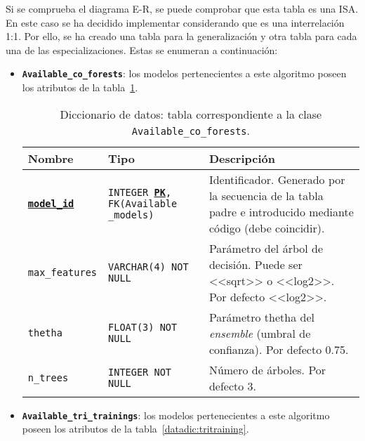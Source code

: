 Si se comprueba el diagrama E-R, se puede comprobar que esta tabla es una ISA. En este caso se ha decidido implementar considerando que es una interrelación 1:1. Por ello, se ha creado una tabla para la generalización y otra tabla para cada una de las especializaciones. Estas se enumeran a continuación:

\begin{itemize}
	\item \textbf{\texttt{Available\_co\_forests}}: los modelos pertenecientes a este algoritmo poseen los atributos de la tabla~\ref{datadic:coforest}.
	
	\begin{table}
		\small
		\begin{centering}
			\begin{tabular}{@{}p{6em} p{9em} p{19em}@{}}
				\toprule
				\textbf{Nombre} & \textbf{Tipo} & \textbf{Descripción}\\
				\midrule
				\texttt{\textbf{\underline{model\_id}}} & \texttt{INTEGER \textbf{\underline{PK}}, FK(Available \_models)} & Identificador. Generado por la secuencia de la tabla padre e introducido mediante código (debe coincidir). \\
				\texttt{max\_features} & \texttt{VARCHAR(4) NOT NULL} & Parámetro del árbol de decisión. Puede ser <<sqrt>> o <<log2>>. Por defecto <<log2>>.   \\
				\texttt{thetha} & \texttt{FLOAT(3) NOT NULL} & Parámetro thetha del \textit{ensemble} (umbral de confianza). Por defecto 0.75.   \\
				\texttt{n\_trees} & \texttt{INTEGER NOT NULL} & Número de árboles. Por defecto 3.   \\
				\bottomrule
			\end{tabular}
		\end{centering}
		\caption[Diccionario de datos: Available\_co\_forests]{Diccionario de datos: tabla correspondiente a la clase \texttt{Available\_co\_forests}.}
		\label{datadic:coforest}
	\end{table}

	\item \textbf{\texttt{Available\_tri\_trainings}}: los modelos pertenecientes a este algoritmo poseen los atributos de la tabla~\ref{datadic:tritraining}.


\end{itemize}
